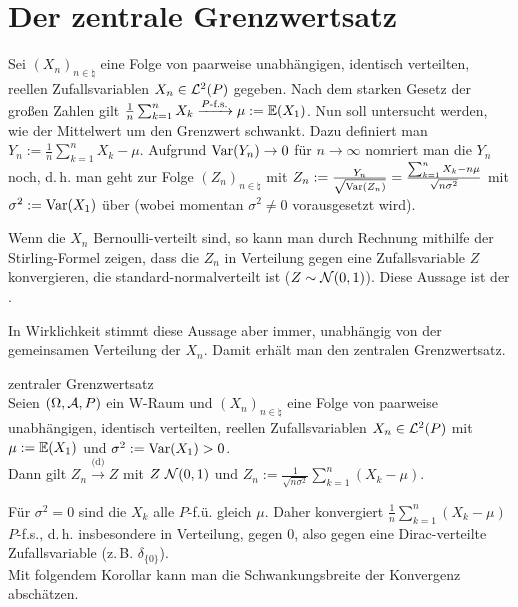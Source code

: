\pagebreak

\section{%
    Der zentrale Grenzwertsatz%
}

\begin{Bem}
    Sei $(X_n)_{n \in \natural}$ eine Folge von paarweise unabhängigen,
    identisch verteilten, reellen Zufallsvariablen $X_n \in \mathcal{L}^2(P)$ gegeben.
    Nach dem starken Gesetz der großen Zahlen gilt
    $\frac{1}{n} \sum_{k=1}^n X_k \xrightarrow{P\text{-f.s.}} \mu := \mathbb{E}(X_1)$.
    Nun soll untersucht werden, wie der Mittelwert um den Grenzwert schwankt.
    Dazu definiert man $Y_n := \frac{1}{n} \sum_{k=1}^n X_k - \mu$.
    Aufgrund $\text{Var}(Y_n) \to 0$ für $n \to \infty$ nomriert man die $Y_n$ noch,
    d.\,h. man geht zur Folge $(Z_n)_{n \in \natural}$ mit
    $Z_n := \frac{Y_n}{\sqrt{\text{Var}(Z_n)}} = \frac{\sum_{k=1}^n X_k - n \mu}
    {\sqrt{n \sigma^2}}$ mit $\sigma^2 := \text{Var}(X_1)$ über
    (wobei momentan $\sigma^2 \not= 0$ vorausgesetzt wird).

    Wenn die $X_n$ Bernoulli-verteilt sind, so kann man durch Rechnung mithilfe der Stirling-Formel
    zeigen, dass die $Z_n$ in Verteilung gegen eine Zufallsvariable $Z$ konvergieren,
    die standard-normalverteilt ist ($Z \sim \mathcal{N}(0, 1)$).
    Diese Aussage ist der .

    In Wirklichkeit stimmt diese Aussage aber immer, unabhängig von der gemeinsamen Verteilung
    der $X_n$.
    Damit erhält man den zentralen Grenzwertsatz.
\end{Bem}

\linie

\begin{Satz}{zentraler Grenzwertsatz}\\
    Seien $(\Omega, \mathcal{A}, P)$ ein W-Raum und $(X_n)_{n \in \natural}$
    eine Folge von paarweise unabhängigen, identisch verteilten,
    reellen Zufallsvariablen $X_n \in \mathcal{L}^2(P)$ mit $\mu := \mathbb{E}(X_1)$ und
    $\sigma^2 := \text{Var}(X_1) > 0$.\\
    Dann gilt $Z_n \xrightarrow{\text{(d)}} Z$ mit $Z ~ \mathcal{N}(0, 1)$ und
    $Z_n := \frac{1}{\sqrt{n \sigma^2}} \sum_{k=1}^n (X_k - \mu)$.
\end{Satz}

\begin{Bem}
    Für $\sigma^2 = 0$ sind die $X_k$ alle $P$-f.ü. gleich $\mu$.
    Daher konvergiert $\frac{1}{n} \sum_{k=1}^n (X_k - \mu)$ $P$-f.s., d.\,h.
    insbesondere in Verteilung, gegen $0$,
    also gegen eine Dirac-verteilte Zufallsvariable (z.\,B. $\delta_{\{0\}}$).\\
    Mit folgendem Korollar kann man die Schwankungsbreite der Konvergenz abschätzen.
\end{Bem}

